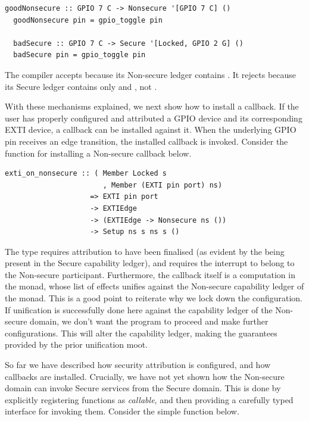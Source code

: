 \documentclass[sigconf]{acmart}
\begin{document}
\begin{lstlisting}[style=haskell]
  goodNonsecure :: GPIO 7 C -> Nonsecure '[GPIO 7 C] ()
  goodNonsecure pin = gpio_toggle pin

  badSecure :: GPIO 7 C -> Secure '[Locked, GPIO 2 G] ()
  badSecure pin = gpio_toggle pin
\end{lstlisting}

The compiler accepts  because its Non-secure ledger contains .
It rejects  because its Secure ledger contains only  and , not .

With these mechanisms explained, we next show how to install a callback.
If the user has properly configured and attributed a GPIO device and its corresponding EXTI device, a callback can be installed against it.
When the underlying GPIO pin receives an edge transition, the installed callback is invoked.
Consider the function for installing a Non-secure callback below.

\begin{lstlisting}[style=haskell]
  exti_on_nonsecure :: ( Member Locked s
                       , Member (EXTI pin port) ns)
                    => EXTI pin port
                    -> EXTIEdge
                    -> (EXTIEdge -> Nonsecure ns ())
                    -> Setup ns s ns s ()
\end{lstlisting}

The type requires attribution to have been finalised (as evident by the  being present in the Secure capability ledger), and requires the interrupt to belong to the Non-secure participant.
Furthermore, the callback itself is a computation in the  monad, whose list of effects unifies against the Non-secure capability ledger of the  monad.
This is a good point to reiterate why we lock down the configuration.
If unification is successfully done here against the capability ledger of the Non-secure domain, we don't want the program to proceed and make further configurations.
This will alter the capability ledger, making the guarantees provided by the prior unification moot.

So far we have described how security attribution is configured, and how callbacks are installed.
Crucially, we have not yet shown how the Non-secure domain can invoke Secure services from the Secure domain.
This is done by explicitly registering  functions as \textit{callable}, and then providing a carefully typed interface for invoking them.
Consider the simple function below.
\end{document}
